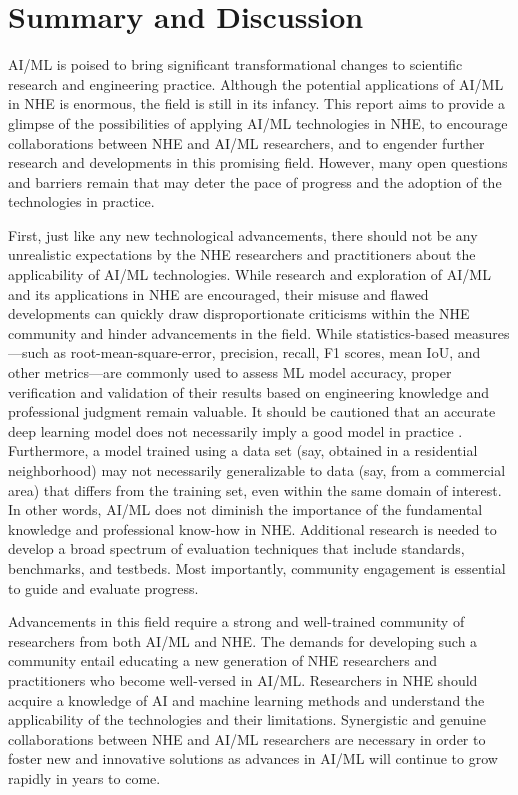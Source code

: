\section{Summary and Discussion}
\label{sec:ai_summary}

AI/ML is poised to bring significant transformational changes to scientific research and engineering practice. Although the potential applications of AI/ML in NHE is enormous, the field is still in its infancy. This report aims to provide a glimpse of the possibilities of applying AI/ML technologies in NHE, to encourage collaborations between NHE and AI/ML researchers, and to engender further research and developments in this promising field. However, many open questions and barriers remain that may deter the pace of progress and the adoption of the technologies in practice. 

First, just like any new technological advancements, there should not be any unrealistic expectations by the NHE researchers and practitioners about the applicability of AI/ML technologies. While research and exploration of AI/ML and its applications in NHE are encouraged, their misuse and flawed developments can quickly draw disproportionate criticisms within the NHE community and hinder advancements in the field. While statistics-based measures—such as root-mean-square-error, precision, recall, F1 scores, mean IoU, and other metrics—are commonly used to assess ML model accuracy, proper verification and validation of their results based on engineering knowledge and professional judgment remain valuable. It should be cautioned that an accurate deep learning model does not necessarily imply a good model in practice \citep{mignan2019forecasting}. Furthermore, a model trained using a data set (say, obtained in a residential neighborhood) may not necessarily generalizable to data (say, from a commercial area) that differs from the training set, even within the same domain of interest. In other words, AI/ML does not diminish the importance of the fundamental knowledge and professional know-how in NHE. Additional research is needed to develop a broad spectrum of evaluation techniques that include standards, benchmarks, and testbeds. Most importantly, community engagement is essential to guide and evaluate progress. 

Advancements in this field require a strong and well-trained community of researchers from both AI/ML and NHE. The demands for developing such a community entail educating a new generation of NHE researchers and practitioners who become well-versed in AI/ML. Researchers in NHE should acquire a knowledge of AI and machine learning methods and understand the applicability of the technologies and their limitations. Synergistic and genuine collaborations between NHE and AI/ML researchers are necessary in order to foster new and innovative solutions as advances in AI/ML will continue to grow rapidly in years to come. 

